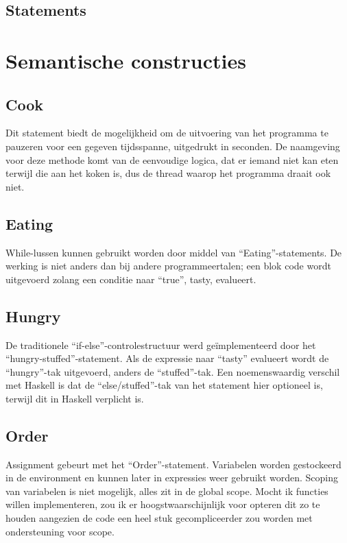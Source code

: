 \documentclass[12pt,a4paper]{report}
\begin{document}
\section{Statements}



\chapter{Semantische constructies}
\section{Cook}
Dit statement biedt de mogelijkheid om de uitvoering van het programma te pauzeren voor een gegeven tijdsspanne, uitgedrukt in seconden. De naamgeving voor deze methode komt van de eenvoudige logica, dat er iemand niet kan eten terwijl die aan het koken is, dus de thread waarop het programma draait ook niet.

\section{Eating}
While-lussen kunnen gebruikt worden door middel van ``Eating''-statements. De werking is niet anders dan bij andere programmeertalen; een blok code wordt uitgevoerd zolang een conditie naar ``true'', tasty, evalueert.

\section{Hungry}
De traditionele ``if-else''-controlestructuur werd geïmplementeerd door het ``hungry-stuffed''-statement. Als de expressie naar ``tasty'' evalueert wordt de ``hungry''-tak uitgevoerd, anders de ``stuffed''-tak. Een noemenswaardig verschil met Haskell is dat de ``else/stuffed''-tak van het statement hier optioneel is, terwijl dit in Haskell verplicht is.

\section{Order}
Assignment gebeurt met het ``Order''-statement. Variabelen worden gestockeerd in de environment en kunnen later in expressies weer gebruikt worden. Scoping van variabelen is niet mogelijk, alles zit in de global scope. Mocht ik functies willen implementeren, zou ik er hoogstwaarschijnlijk voor opteren dit zo te houden aangezien de code een heel stuk gecompliceerder zou worden met ondersteuning voor scope.
\end{document}
